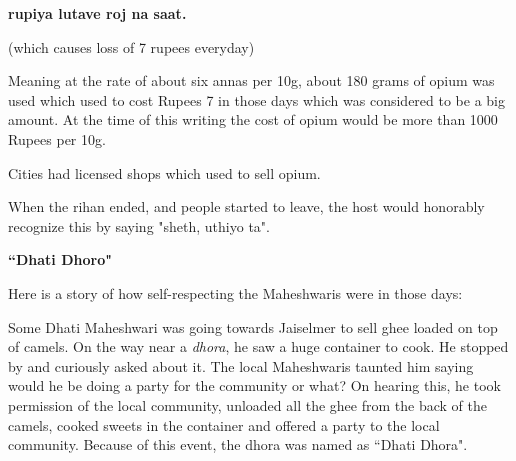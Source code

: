 \textbf{rupiya lutave roj na saat.}

(which causes loss of 7 rupees everyday)

Meaning at the rate of about six annas per 10g, about 180 grams of opium was
used which used to cost Rupees 7 in those days which was considered to be a big
amount. At the time of this writing the cost of opium would be more than 1000
Rupees per 10g.

Cities had licensed shops which used to sell opium.

When the rihan ended, and people started to leave, the host would honorably
recognize this by saying "sheth, uthiyo ta".

\begin{framed}
\begin{center}\textbf{``Dhati Dhoro"}\end{center}
Here is a story of how self-respecting the Maheshwaris were in those days:

Some Dhati Maheshwari was going towards Jaiselmer to sell ghee loaded on top of
camels. On the way near a \textit{dhora}, he saw a huge container to cook. He
stopped by and curiously asked about it. The local Maheshwaris taunted him
saying would he be doing a party for the community or what? On hearing this, he
took permission of the local community, unloaded all the ghee from the back of
the camels, cooked sweets in the container and offered a party to the local
community. Because of this event, the dhora was named as ``Dhati Dhora".

\end{framed}
